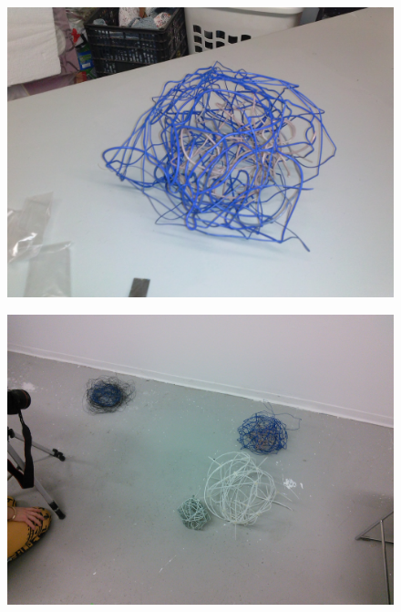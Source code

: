 \begin{figure}[h!]
\centering
\includegraphics[width=\hsize]{art/CAM00454.jpg}
\caption{\label{fig:art_1}  }
\end{figure}



\begin{figure}[h!]
\centering
\includegraphics[width=\hsize]{art/IMG_20160205_113249.jpg}
\caption{\label{fig:art_3}  }
\end{figure}
